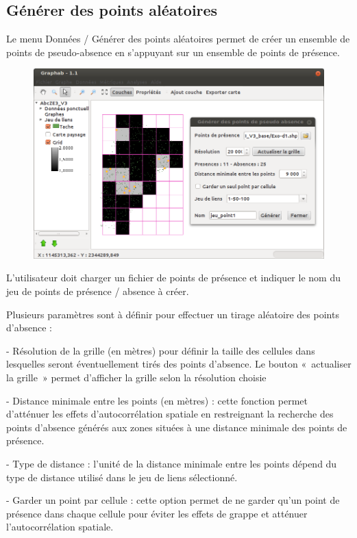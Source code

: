 \documentclass{article}
\begin{document}
\subsection{Générer des points aléatoires}

Le menu Données / Générer des points aléatoires permet de créer un ensemble de points de pseudo-absence en s’appuyant sur un ensemble de points de présence.

\begin{figure}[H]
	\includegraphics[scale=0.5]{img/manual-fr_img14.png} 
\end{figure}

L’utilisateur doit charger un fichier de points de présence et indiquer le nom du jeu de points de présence / absence à créer.

Plusieurs paramètres sont à définir pour effectuer un tirage aléatoire des points d’absence :

{}- Résolution de la grille (en mètres) pour définir la taille des cellules dans lesquelles seront éventuellement tirés des points d’absence. Le bouton «~actualiser la grille~» permet d’afficher la grille selon la résolution choisie

{}- Distance minimale entre les points (en mètres) : cette fonction permet d’atténuer les effets d’autocorrélation spatiale en restreignant la recherche des points  d'absence générés aux zones situées à une distance minimale des points de présence.

{}- Type de distance : l’unité de la distance minimale entre les points dépend du type de distance utilisé dans le jeu de liens sélectionné.

{}- Garder un point par cellule : cette option permet de ne garder qu’un point de présence dans chaque cellule pour éviter les effets de  grappe et atténuer l'autocorrélation spatiale.
\end{document}
